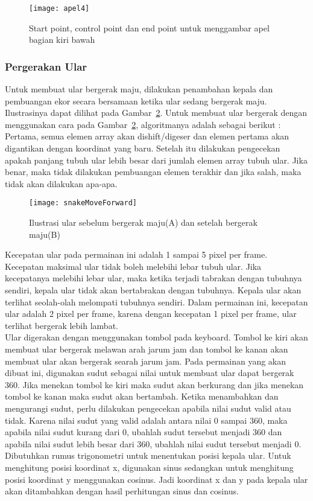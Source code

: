\begin{figure}[H]
	\centering  
	\texttt{[image: apel4]}  
	\caption[Start point, control point dan end point untuk menggambar apel bagian kiri bawah]{Start point, control point dan end point untuk menggambar apel bagian kiri bawah}
	\label{fig:apel4} 
\end{figure}

\subsubsection{Pergerakan Ular}
Untuk membuat ular bergerak maju, dilakukan penambahan kepala dan pembuangan ekor secara bersamaan ketika ular sedang bergerak maju. Ilustrasinya dapat dilihat pada Gambar~\ref{fig:snakeMoveForward}. Untuk membuat ular bergerak dengan menggunakan cara pada Gambar~\ref{fig:snakeMoveForward}, algoritmanya adalah sebagai berikut : Pertama, semua elemen array akan dishift/digeser dan elemen pertama akan digantikan dengan koordinat yang baru. Setelah itu dilakukan pengecekan apakah panjang tubuh ular lebih besar dari jumlah elemen array tubuh ular. Jika benar, maka tidak dilakukan pembuangan elemen terakhir dan jika salah, maka tidak akan dilakukan apa-apa. 

\begin{figure}[H]
	\centering  
	\texttt{[image: snakeMoveForward]}  
	\caption[Ilustrasi ular sebelum bergerak maju(A) dan setelah bergerak maju(B)]{Ilustrasi ular sebelum bergerak maju(A) dan setelah bergerak maju(B)}
	\label{fig:snakeMoveForward} 
\end{figure}

Kecepatan ular pada permainan ini adalah 1 sampai 5 pixel per frame. Kecepatan maksimal ular tidak boleh melebihi lebar tubuh ular. Jika kecepatanya melebihi lebar ular, maka ketika terjadi tabrakan dengan tubuhnya sendiri, kepala ular tidak akan bertabrakan dengan tubuhnya. Kepala ular akan terlihat seolah-olah melompati tubuhnya sendiri. Dalam permainan ini, kecepatan ular adalah 2 pixel per frame, karena dengan kecepatan 1 pixel per frame, ular terlihat bergerak lebih lambat.\\

Ular digerakan dengan menggunakan tombol pada keyboard. Tombol ke kiri akan membuat ular bergerak melawan arah jarum jam dan tombol ke kanan akan membuat ular akan bergerak searah jarum jam. Pada permainan yang akan dibuat ini, digunakan sudut sebagai nilai untuk membuat ular dapat bergerak 360. Jika menekan tombol ke kiri maka sudut akan berkurang dan jika menekan tombol ke kanan maka sudut akan bertambah. Ketika menambahkan dan mengurangi sudut, perlu dilakukan pengecekan apabila nilai sudut valid atau tidak. Karena nilai sudut yang valid adalah antara nilai 0 sampai 360, maka apabila nilai sudut kurang dari 0, ubahlah sudut tersebut menjadi 360 dan apabila nilai sudut lebih besar dari 360, ubahlah nilai sudut tersebut menjadi 0. Dibutuhkan rumus trigonometri untuk menentukan posisi kepala ular. Untuk menghitung posisi koordinat x, digunakan sinus sedangkan untuk menghitung posisi koordinat y menggunakan cosinus. Jadi koordinat x dan y pada kepala ular akan ditambahkan dengan hasil perhitungan sinus dan cosinus.

